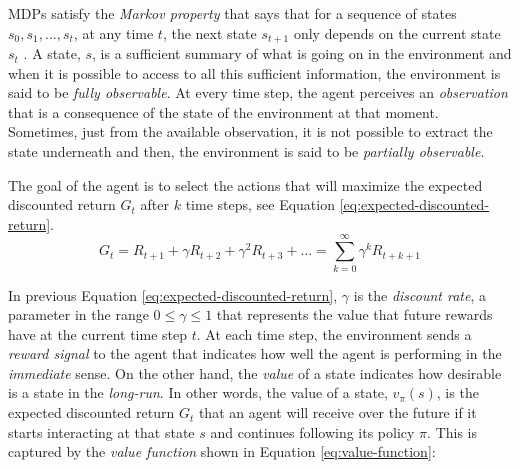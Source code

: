 








MDPs satisfy the \textit{Markov property} that says that for a sequence of states $s_0, s_1, ..., s_t$, at any time $t$, the next state $s_{t+1}$ only depends on the current state $s_t$ \cite{Osa:2018}. A state, $s$, is a sufficient summary of what is going on in the environment and when it is possible to access to all this sufficient information, the environment is said to be \textit{fully observable}. At every time step, the agent perceives an \textit{observation} that is a consequence of the state of the environment at that moment. Sometimes, just from the available observation, it is not possible to extract the state underneath and then, the environment is said to be \textit{partially observable}. 

The goal of the agent is to select the actions that will maximize the expected discounted return $G_t$ after $k$ time steps, see Equation \eqref{eq:expected-discounted-return}.
\begin{equation}
G_t = R_{t+1} + \gamma R_{t+2} + \gamma^2 R_{t+3} +... = \sum_{k=0}^{\infty} \gamma ^k R_{t+k+1}
\label{eq:expected-discounted-return}
\end{equation}




In previous Equation \eqref{eq:expected-discounted-return}, $\gamma$ is the \textit{discount rate}, a parameter in the range $0 \leq \gamma \leq 1$ that represents the value that future rewards have at the current time step $t$. At each time step, the environment sends a \textit{reward signal} to the agent that indicates how well the agent is performing in the \textit{immediate} sense. On the other hand, the \textit{value} of a state indicates how desirable is a state in the \textit{long-run}. In other words, the value of a state, $v_\pi \left(s\right) $, is the expected discounted return $G_t$ that an agent will receive over the future if it starts interacting at that state $s$ and continues following its policy $\pi$. This is captured by the \textit{value function} shown in Equation \eqref{eq:value-function}:






